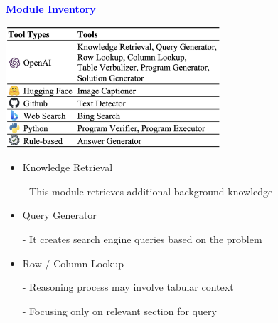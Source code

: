 \documentclass[professionalfont]{beamer}
\begin{document}
\begin{frame}

\begin{center}
    { \textbf{\textcolor{blue}{ {\fontsize{12}{14}\selectfont Module Inventory} }} }
\end{center}

\begin{center}
    \includegraphics[width=0.6\textwidth]{table/2.png}
\end{center}

\begin{itemize}
    \item Knowledge Retrieval

    - This module retrieves additional background knowledge

    \item Query Generator

    - It creates search engine queries based on the problem

    \item Row / Column Lookup

    - Reasoning process may involve tabular context

    - Focusing only on relevant section for query
\end{itemize}

\end{frame}
\end{document}
